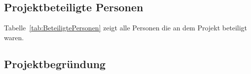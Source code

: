 \subsection{Projektbeteiligte Personen} 
\label{sec:Projektbeteiligte Personen}
Tabelle~\ref{tab:BeteiligtePersonen} zeigt alle Personen die an dem Projekt beteiligt waren.
\\


\subsection{Projektbegründung} 
\label{sec:Projektbegruendung}